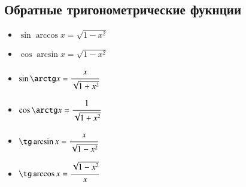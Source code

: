 \documentclass[twoside, a4paperpt, fleqn]{extarticle}
\begin{document}
    \subsection*{Обратные тригонометрические фукнции}
    \begin{itemize}
        \item $ \sin\arccos x = \sqrt{1-x^2} $ 
        \item $ \cos\arcsin x = \sqrt{1-x^2} $ 
        \item $ \sin\arctg x = \cfrac{x}{\sqrt{1+x^2}} $ 
        \item $ \cos\arctg x = \cfrac{1}{\sqrt{1+x^2}} $
        \item $ \tg\arcsin x = \cfrac{x}{\sqrt{1-x^2}} $
        \item $ \tg\arccos x = \cfrac{\sqrt{1-x^2}}{x} $
    \end{itemize}
\end{document}
